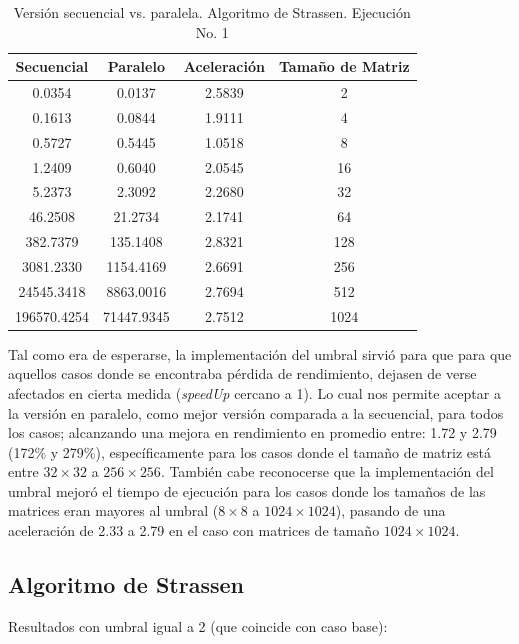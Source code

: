 \documentclass{article}
\begin{document}
\begin{table}[ht]
\centering
\begin{tabular}{|c|c|c|c|}
\hline
\textbf{Secuencial} & \textbf{Paralelo} & \textbf{Aceleración} & \textbf{Tamaño de Matriz} \\
\hline
0.0354 & 0.0137 & 2.5839 & 2 \\
0.1613 & 0.0844 & 1.9111 & 4 \\
0.5727 & 0.5445 & 1.0518 & 8 \\
1.2409 & 0.6040 & 2.0545 & 16 \\
5.2373 & 2.3092 & 2.2680 & 32 \\
46.2508 & 21.2734 & 2.1741 & 64 \\
382.7379 & 135.1408 & 2.8321 & 128 \\
3081.2330 & 1154.4169 & 2.6691 & 256 \\
24545.3418 & 8863.0016 & 2.7694 & 512 \\
196570.4254 & 71447.9345 & 2.7512 & 1024 \\
\hline
\end{tabular}
\caption{Versión secuencial vs. paralela. Algoritmo de Strassen. Ejecución No. 1}
\end{table}

Tal como era de esperarse, la implementación del umbral sirvió para que para que aquellos casos donde se encontraba pérdida de rendimiento, dejasen de verse afectados en cierta medida (\textit{speedUp} cercano a 1). Lo cual nos permite aceptar a la versión en paralelo, como mejor versión comparada a la secuencial, para todos los casos; alcanzando una mejora en rendimiento en promedio entre: 1.72 y 2.79 (172\% y 279\%), específicamente para los casos donde el tamaño de matriz está entre \(32 \times 32\) a \(256 \times 256\). También cabe reconocerse que la implementación del umbral mejoró el tiempo de ejecución para los casos donde los tamaños de las matrices eran mayores al umbral (\(8 \times 8\) a \(1024 \times 1024\)), pasando de una aceleración de 2.33 a 2.79 en el caso con matrices de tamaño \(1024 \times 1024\).

\clearpage

\subsection{Algoritmo de Strassen}

Resultados con umbral igual a 2 (que coincide con caso base):
\end{document}
